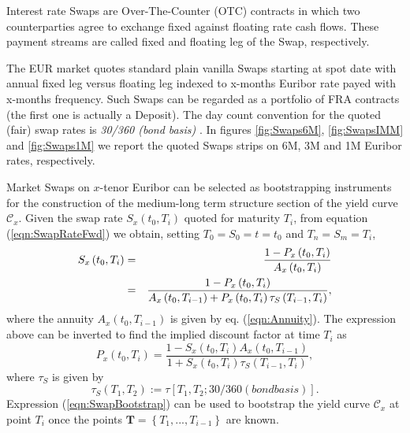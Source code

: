 \documentclass[11pt,reqno]{amsart}
\begin{document}
Interest rate Swaps are Over-The-Counter (OTC) contracts in which two counterparties agree to exchange fixed against floating rate cash flows. These payment streams are called fixed and floating leg of the Swap, respectively.
\par
The EUR market quotes standard plain vanilla Swaps starting at spot date with annual fixed leg versus floating leg indexed to x-months Euribor rate payed with x-months frequency. Such Swaps can be regarded as a portfolio of FRA contracts (the first one is actually a Deposit). The day count convention for the quoted (fair) swap rates is \emph{30/360 (bond basis)} \cite{ISDA}.
In figures \ref{fig:Swaps6M}, \ref{fig:SwapsIMM} and \ref{fig:Swaps1M} we report the quoted Swaps strips on 6M, 3M and 1M Euribor rates, respectively.
\par
Market Swaps on $x$-tenor Euribor can be selected as bootstrapping instruments for the construction of the medium-long term structure section of the yield curve $\mathcal{C}_x$.
Given the swap rate $S_x\left(t_0,T_i\right)$ quoted for maturity $T_i$, from equation (\ref{eqn:SwapRateFwd}) we obtain, setting $T_0=S_0=t=t_0$ and $T_n=S_m=T_i$,
\begin{eqnarray}
S_x\left(t_0,T_i\right)
&=& \frac{1 - P_x\left(t_0,T_i\right)}
         {A_x\left(t_0,T_i\right)} \notag\\
&=& \frac{1 - P_x\left(t_0,T_i\right)}
         {A_x\left(t_0,T_{i-1}\right)+P_x\left(t_0,T_i\right)\tau_S\left(T_{i-1},T_i\right)},
\label{eqn:SwapRateMkt}
\end{eqnarray}
where the annuity $A_x\left(t_0,T_{i-1}\right)$ is given by eq. (\ref{eqn:Annuity}).
The expression above can be inverted to find the implied discount factor at time $T_i$ as
\begin{equation}
P_x\left(t_0,T_i\right)
=   \frac{1-S_x\left(t_0,T_i\right)A_x\left(t_0,T_{i-1}\right)}
         {1+S_x\left(t_0,T_i\right)\tau_S\left(T_{i-1},T_i\right)},
\label{eqn:SwapBootstrap}
\end{equation}
where $\tau_S$ is given by
\begin{equation}
\tau_S\left(T_1,T_2\right) := \tau\left[T_1,T_2;30/360 (bond basis)\right].
\end{equation}
Expression (\ref{eqn:SwapBootstrap}) can be used to bootstrap the yield curve $\mathcal{C}_x$ at point $T_i$ once the points $\mathbf{T=}\left\{T_1,...,T_{i-1}\right\}$ are known.
\end{document}
